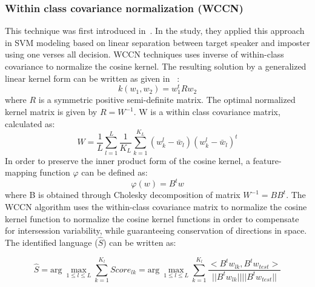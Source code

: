 \begin{spacing}{1.5}
  \subsubsection{Within class covariance normalization (WCCN)}
  This technique was first introduced in~\cite{hatch2006within}. In the study, they applied this approach in SVM modeling based on linear separation between target speaker and imposter using one verses all decision. WCCN techniques uses inverse of within-class covariance to normalize the cosine kernel. The resulting solution by a generalized linear kernel form can be written as given in ~\cite{hatch2006within}:
  \begin{equation}
      k(w_{1},w_{2})=w_{1}^{t}Rw_{2}
  \end{equation}
  where $R$ is a symmetric positive semi-definite matrix. The optimal normalized kernel matrix is given by $R=W^{-1}$. W is a within class covariance matrix, calculated as:
  \begin{equation}
      W=\frac{1}{L}\sum_{l=1}^{L}\frac{1}{K_{L}}\sum_{k=1}^{K_{L}}(w_{k}^{l}-\bar{w}_{l})(w_{k}^{l}-\bar{w}_{l})^{t}
  \end{equation}
  In order to preserve the inner product form of the cosine kernel, a feature-mapping function $\varphi$ can be defined as:
  \begin{equation}
      \varphi(w)=B^{t}w
  \end{equation}
  where B is obtained through Cholesky decomposition of matrix $W^{-1}=BB^{t}$. The WCCN algorithm uses the within-class covariance matrix to normalize the cosine kernel function to normalize the cosine kernel functions in order to compensate for intersession variability, while guaranteeing conservation of directions in space. The identified language ($\hat{S}$) can be written as:
 
 \begin{equation}
     \hat{S}=\mbox{arg}~\max_{1 \leq l \leq L} \sum_{k=1}^{K_{l}} Score_{lk}=\mbox{arg}~\max_{1 \leq l \leq L} \sum_{k=1}^{K_{l}} \frac{<B^{t}w_{lk},B^{t}w_{test}>}{||B^{t}w_{lk}||||B^{t}w_{test}||}
 \end{equation} 
 

\end{spacing}
